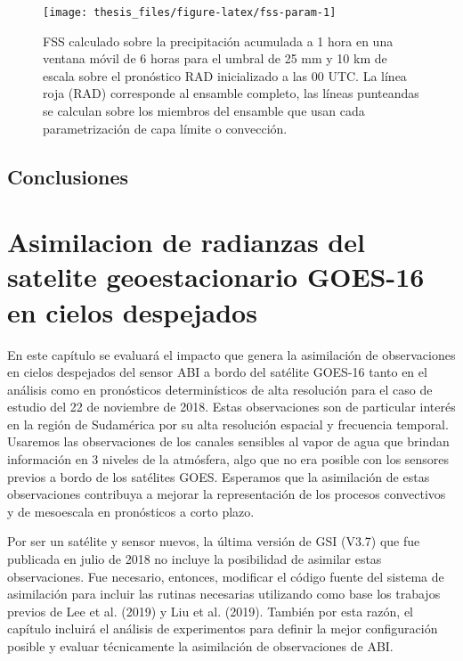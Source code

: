\documentclass[12pt,oneside,a4paper]{reedthesis}
\begin{document}
\begin{figure}
\texttt{[image: thesis\_files/figure-latex/fss-param-1]} \caption{FSS calculado sobre la precipitación acumulada a 1 hora en una ventana móvil de 6 horas para el umbral de 25 mm y 10 km de escala sobre el pronóstico RAD inicializado a las 00 UTC. La línea roja (RAD) corresponde al ensamble completo, las líneas punteandas se calculan sobre los miembros del ensamble que usan cada parametrización de capa límite o convección.}\label{fig:fss-param}
\end{figure}
\hypertarget{conclusiones-1}{%
\section{Conclusiones}\label{conclusiones-1}}

\hypertarget{asimilacion-de-radianzas-del-satelite-geoestacionario-goes-16-en-cielos-despejados}{%
\chapter{Asimilacion de radianzas del satelite geoestacionario GOES-16 en cielos despejados}\label{asimilacion-de-radianzas-del-satelite-geoestacionario-goes-16-en-cielos-despejados}}

En este capítulo se evaluará el impacto que genera la asimilación de observaciones en cielos despejados del sensor ABI a bordo del satélite GOES-16 tanto en el análisis como en pronósticos determinísticos de alta resolución para el caso de estudio del 22 de noviembre de 2018. Estas observaciones son de particular interés en la región de Sudamérica por su alta resolución espacial y frecuencia temporal. Usaremos las observaciones de los canales sensibles al vapor de agua que brindan información en 3 niveles de la atmósfera, algo que no era posible con los sensores previos a bordo de los satélites GOES. Esperamos que la asimilación de estas observaciones contribuya a mejorar la representación de los procesos convectivos y de mesoescala en pronósticos a corto plazo.

Por ser un satélite y sensor nuevos, la última versión de GSI (V3.7) que fue publicada en julio de 2018 no incluye la posibilidad de asimilar estas observaciones. Fue necesario, entonces, modificar el código fuente del sistema de asimilación para incluir las rutinas necesarias utilizando como base los trabajos previos de Lee et al. (2019) y Liu et al. (2019). También por esta razón, el capítulo incluirá el análisis de experimentos para definir la mejor configuración posible y evaluar técnicamente la asimilación de observaciones de ABI.
\end{document}
